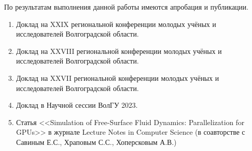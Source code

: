 





По результатам выполнения данной работы имеются апробация и публикации.
\begin{enumerate}[beginpenalty=10000] %
    \item Доклад на XXIX региональной конференции молодых учёных и исследователей Волгоградской области.
    \item Доклад на XXVIII региональной конференции молодых учёных и исследователей Волгоградской области.
    \item Доклад на XXVII региональной конференции молодых учёных и исследователей Волгоградской области.
    \item Доклад в Научной сессии ВолГУ 2023.
    \item Статья <<Simulation of Free-Surface Fluid Dynamics: Parallelization for GPUs>> в журнале Lecture Notes in Computer Science 
    (в соавторстве с Савиным Е.С., Храповым С.С., Хоперсковым А.В.)~\cite{Savin2023}
\end{enumerate}


